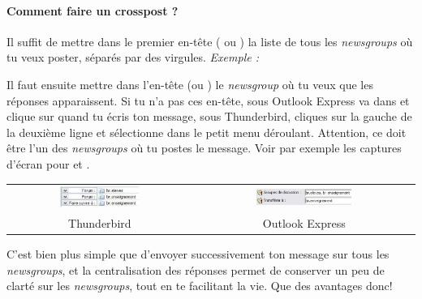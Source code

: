 \paragraph{Comment faire un crosspost ?}
Il suffit de mettre dans le premier en-tête ( ou ) la liste de tous les \emph{newsgroups} où tu veux
poster, séparés par des virgules. \emph{Exemple :} 

Il faut ensuite mettre dans l'en-tête  (ou ) le \emph{newsgroup} où tu veux que les réponses apparaissent. Si
tu n'a pas ces en-tête, sous Outlook Express va dans  et clique sur  quand tu écris ton message, sous
Thunderbird, cliques sur la gauche de la deuxième ligne et sélectionne  dans le petit menu déroulant. Attention, ce doit être
l'un des \emph{newsgroups} où tu postes le message.
Voir par exemple les captures d'écran pour  et .\\

\noindent\begin{tabular}{cc}
\includegraphics[width=0.45\textwidth]{images/cross_post_TB}
     & \includegraphics[width=0.45\textwidth]{images/cross_post_OE} \\
Thunderbird & Outlook Express
\end{tabular}
\vskip 12pt

C'est bien plus simple que d'envoyer successivement ton message sur tous les \emph{newsgroups}, et la centralisation des réponses permet de conserver
un peu de clarté sur les \emph{newsgroups}, tout en te facilitant la vie. Que des avantages donc!
